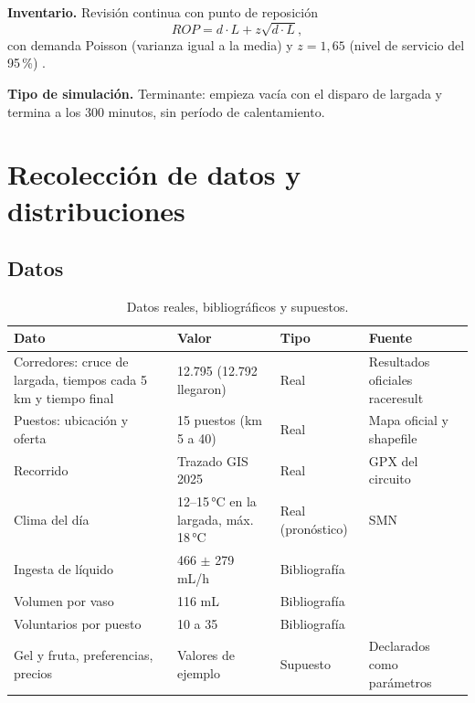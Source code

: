 \documentclass[11pt,a4paper]{article}
\begin{document}
\textbf{Inventario.} Revisión continua con punto de reposición
\begin{equation}
    ROP = d \cdot L + z \sqrt{d \cdot L},
\end{equation}
con demanda Poisson (varianza igual a la media) y $z = 1{,}65$ (nivel de servicio del 95\,\%) \cite{silver}.

\textbf{Tipo de simulación.} Terminante: empieza vacía con el disparo de largada y termina a los 300 minutos, sin período de calentamiento.

\section{Recolección de datos y distribuciones}

\subsection{Datos}

\begin{table}[H]
\centering
\small
\begin{tabular}{P{4.2cm}P{3.6cm}P{2cm}P{4.2cm}}
\toprule
\textbf{Dato} & \textbf{Valor} & \textbf{Tipo} & \textbf{Fuente} \\
\midrule
Corredores: cruce de largada, tiempos cada 5\,km y tiempo final & 12.795 (12.792 llegaron) & Real & Resultados oficiales raceresult \cite{raceresult} \\
Puestos: ubicación y oferta & 15 puestos (km 5 a 40) & Real & Mapa oficial y shapefile \\
Recorrido & Trazado GIS 2025 & Real & GPX del circuito \\
Clima del día & 12--15\,°C en la largada, máx. 18\,°C & Real (pronóstico) & SMN \cite{smn} \\
Ingesta de líquido & 466 $\pm$ 279 mL/h & Bibliografía & \cite{jimenez} \\
Volumen por vaso & 116 mL & Bibliografía & \cite{cheuvront} \\
Voluntarios por puesto & 10 a 35 & Bibliografía & \cite{vermont} \\
Gel y fruta, preferencias, precios & Valores de ejemplo & Supuesto & Declarados como parámetros \\
\bottomrule
\end{tabular}
\caption{Datos reales, bibliográficos y supuestos.}
\end{table}
\end{document}
